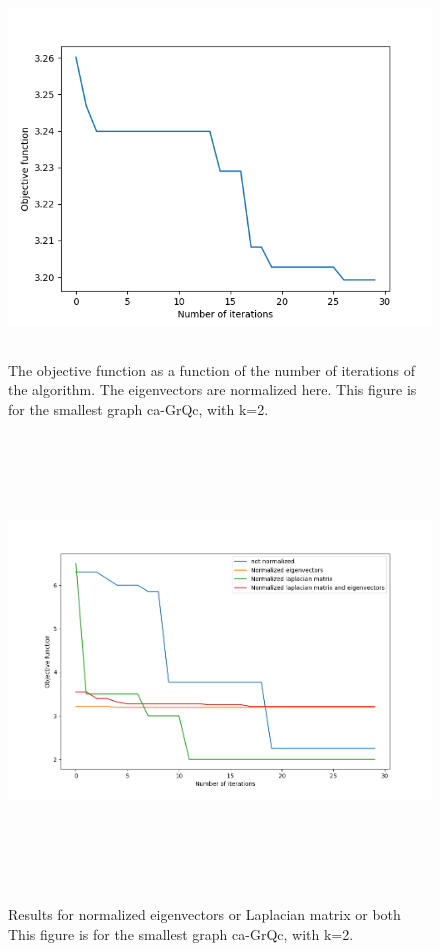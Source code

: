 \documentclass{article}
\begin{document}
\begin{figure}[htb]
\begin{center}
\includegraphics[height=10cm]{plot2.png}
\end{center}
\caption{The objective function as a function of the number of iterations of the algorithm.
The eigenvectors are normalized here. This figure is for the smallest graph ca-GrQc, with k=2.}
\end{figure}

\begin{figure}[htb]
\begin{center} \label{normalized}
\includegraphics[height=12cm]{normalization_plot.png}
\end{center}
\caption{Results for normalized eigenvectors or Laplacian matrix or both
This figure is for the smallest graph ca-GrQc, with k=2.}
\end{figure}
\end{document}
